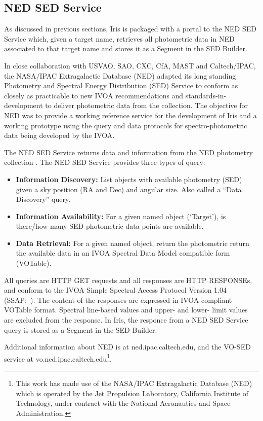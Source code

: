 \documentclass[5p]{elsarticle}
\begin{document}
\subsection{NED SED Service}
\label{subsec:ned}

As discussed in previous sections, Iris is packaged with a portal to the NED SED Service which, given a target name, retrieves all photometric data in NED associated to that target name and stores it as a Segment in the SED Builder.

In close collaboration with USVAO, SAO, CXC, CfA, MAST and Caltech/IPAC, the NASA/IPAC Extragalactic Database (NED) adapted its long standing Photometry and Spectral Energy Distribution (SED) Service to conform as closely as practicable to new IVOA recommendations and
standards-in-development to deliver photometric data from the collection. The objective for NED was to provide a working reference service for the development of Iris and a working prototype using the query and data protocols for spectro-photometric data being developed by the IVOA.

The NED SED Service returns data and information from the NED photometry collection \citep{2007ASPC..376..153M}. The NED SED Service provides three types of query:
\begin{itemize}
 \item \textbf{Information Discovery:} List objects with available photometry (SED) given a sky position (RA and Dec) and angular size.  Also called a ``Data Discovery'' query.
 \item \textbf{Information Availability:} For a given named object (`Target'), is there/how many SED photometric data points are available.
 \item \textbf{Data Retrieval:} For a given named object, return the photometric return the available data in an IVOA Spectral Data Model compatible form (VOTable).
\end{itemize}

All queries are HTTP GET requests and all responses are HTTP RESPONSEs, and conform to the IVOA Simple Spectral Access Protocol Version 1.04 (SSAP;~\citep{2012arXiv1203.5725T}).  The content of the responses are expressed in IVOA-compliant VOTable format. Spectral line-based values and upper- and lower- limit values are excluded from the response. In Iris, the responce from a NED SED Service query is stored as a Segment in the SED Builder.

Additional information about NED is at ned.ipac.caltech.edu, and the VO-SED service at
vo.ned.ipac.caltech.edu\footnote{This work has made use of the NASA/IPAC Extragalactic Database (NED) which is operated by the Jet Propulsion Laboratory, California Institute of Technology, under contract with the National Aeronautics and Space Administration.}. 
\end{document}
